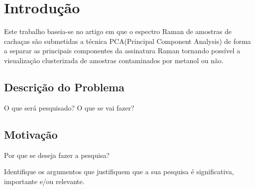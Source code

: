 \documentclass[english]{article}
\begin{document}
\pagestyle{empty} 
\sloppy
{}

\begin{abstract}
O presente trabalho valida a utilização de redes neurais artificiais na interpretação de dados do espectro Raman de amostras de cachaça. Combinando a modelagem a técnica PCA(Principal Component Analysis) de forma a maximizar a taxa de sucesso obtida. \vspace{0.5cm}
\end{abstract}

\section{Introdução}
Este trabalho baseia-se no artigo \cite{DeGoes2016} em que o espectro Raman de amostras de cachaças são submetidas a técnica PCA(Principal Component Analysis) de forma a separar as principais componentes da assinatura Raman tornando possível a visualização clusterizada de amostras contaminados por metanol ou não. \vspace{0.5cm}

\subsection{Descrição do Problema}
\vspace{1cm} O que será pesquisado? O que se vai fazer?
\subsection{Motivação}
\vspace{1cm} Por que se deseja fazer a pesquisa? \vspace{1cm}

Identifique os argumentos que justifiquem que a sua pesquisa é
significativa, importante e/ou relevante. %
\end{document}
